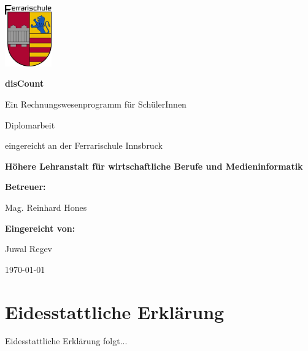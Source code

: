 \documentclass[12pt]{report}
\begin{document}
  
   
  
\begin{titlepage}
	\centering
	\includegraphics[width=0.15\textwidth]{images/ferrarilogo.jpg}\par\vspace{1cm}
	\vspace{3cm}
	{\huge \textbf{disCount}\par}
	\vspace{0.5cm}
	{\huge Ein Rechnungswesenprogramm für SchülerInnen}\par
		
	\vspace{1.5cm}
		
	{\huge Diplomarbeit\par}
		
	\vspace{1.5cm}
		
	{\large eingereicht an der Ferrarischule Innsbruck}\par
	\vspace{0.5cm}
	{\large \textbf{Höhere Lehranstalt für wirtschaftliche Berufe und Medieninformatik}}\par
	\vspace{1cm}
	{\large \textbf{Betreuer:}}\par
	\vspace{0.5cm}
	{\large Mag. Reinhard Hones}\par
	\vspace{1cm}
	{\large \textbf{Eingereicht von:}}\par
	\vspace{0.5cm}
	{\large Juwal Regev}\par
	
	\vfill
	{\large \today\par}
\end{titlepage}
  
\section*{Eidesstattliche Erklärung}

Eidesstattliche Erklärung folgt...


\newpage
  
\end{document}
